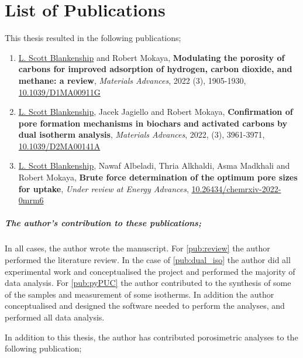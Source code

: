 \cleardoublepage

\chapter*{List of Publications}

This thesis resulted in the following publications;

\begin{enumerate}[label=\Roman*, ref={\textbf{Publication \Roman*}}]
    \item \underline{L. Scott Blankenship} and Robert Mokaya, \textbf{Modulating the porosity of carbons for improved adsorption of hydrogen, carbon dioxide, and methane: a review}, \textit{Materials Advances}, 2022 (3), 1905-1930, \href{https://doi.org/10.1039/D1MA00911G}{10.1039/D1MA00911G}
    \label{pub:review}
    \item \underline{L. Scott Blankenship}, Jacek Jagiello and Robert Mokaya, \textbf{Confirmation of pore formation mechanisms in biochars and activated carbons by dual isotherm analysis}, \textit{Materials Advances}, 2022, (3), 3961-3971, \href{https://doi.org/10.1039/D2MA00141A}{10.1039/D2MA00141A}
    \label{pub:dual_iso}
    \item \underline{L. Scott Blankenship}, Nawaf Albeladi, Thria Alkhaldi, Asma Madkhali and Robert Mokaya, \textbf{Brute force determination of the optimum pore sizes for  uptake}, \textit{Under review at Energy Advances}, \href{https://doi.org/10.26434/chemrxiv-2022-0mrm6}{10.26434/chemrxiv-2022-0mrm6}
    \label{pub:pyPUC}
    
\end{enumerate}

\paragraph{The author's contribution to these publications;}
In all cases, the author wrote the manuscript. For \ref{pub:review} the author performed the literature review. In the case of \ref{pub:dual_iso} the author did all experimental work and conceptualised the project and performed the majority of data analysis. For \ref{pub:pyPUC} the author contributed to the synthesis of some of the samples and measurement of some isotherms. In addition the author conceptualised and designed the software needed to perform the analyses, and performed all data analysis.

In addition to this thesis, the author has contributed porosimetric analyses to the following publication;

